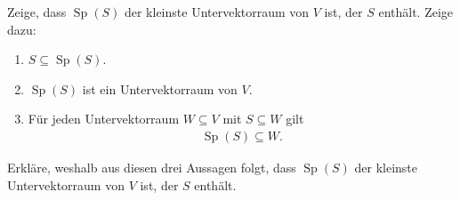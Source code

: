 \documentclass[a4paper,10pt]{article}
\newcommand{\Sp}{\operatorname{Sp}}
\begin{document}
Zeige, dass $\Sp(S)$ der kleinste Untervektorraum von $V$ ist, der $S$ enthält. Zeige dazu:

\begin{enumerate}[label=(\alph*)]
    \item $S\subseteq \Sp(S)$.
    \item $\Sp(S)$ ist ein Untervektorraum von $V$.
    \item Für jeden Untervektorraum $W\subseteq V$ mit $S\subseteq W$ gilt
    \begin{align*}
        \Sp(S)\subseteq W.
    \end{align*}
\end{enumerate}

Erkläre, weshalb aus diesen drei Aussagen folgt, dass $\Sp(S)$ der kleinste Untervektorraum von $V$ ist, der $S$ enthält.
\end{document}

